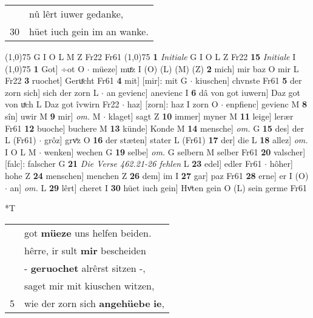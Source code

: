 \documentclass[8pt,a4paper,notitlepage]{article}
\begin{document}
\begin{table}[ht]
\begin{minipage}[t]{0.5\linewidth}
\begin{tabular}{rl}
 & nû lêrt iuwer gedanke,\\ 
30 & hüet iuch gein im an wanke.\\ 
\end{tabular}
\scriptsize
\line(1,0){75} \newline
G I O L M Z Fr22 Fr61 \newline
\line(1,0){75} \newline
\textbf{1} \textit{Initiale} G I O L Z Fr22  \textbf{15} \textit{Initiale} I  \newline
\line(1,0){75} \newline
\textbf{1} Got] ÷ot O  $\cdot$ müeze] muͤz I (O) (L) (M) (Z) \textbf{2} mich] mir baz O mir L Fr22 \textbf{3} ruochet] Geruͤcht Fr61 \textbf{4} mit] [mir]: mit G  $\cdot$ kiuschen] chvnste Fr61 \textbf{5} der zorn sich] sich der zorn L  $\cdot$ an gevienc] anevienc I \textbf{6} dâ von got iuwern] Daz got von uͯch L Daz got îvwirn Fr22  $\cdot$ haz] [zorn]: haz I zorn O  $\cdot$ enpfienc] gevienc M \textbf{8} sîn] uwir M \textbf{9} mir] \textit{om.} M  $\cdot$ klaget] sagt Z \textbf{10} immer] myner M \textbf{11} leige] lerær Fr61 \textbf{12} buoche] buchere M \textbf{13} künde] Konde M \textbf{14} mensche] \textit{om.} G \textbf{15} des] der L (Fr61)  $\cdot$ grôz] grvͦz O \textbf{16} der stæten] stater L (Fr61) \textbf{17} der] die L \textbf{18} allez] \textit{om.} I O L M  $\cdot$ wenken] wechen G \textbf{19} selbe] \textit{om.} G selbern M selber Fr61 \textbf{20} valscher] [falc]: falscher G \textbf{21} \textit{Die Verse 462.21-26 fehlen} L  \textbf{23} edel] edler Fr61  $\cdot$ hôher] hohe Z \textbf{24} menschen] menchen Z \textbf{26} dem] im I \textbf{27} gar] paz Fr61 \textbf{28} erne] er I (O)  $\cdot$ an] \textit{om.} L \textbf{29} lêrt] cheret I \textbf{30} hüet iuch gein] Hvͦten gein O (L) sein germe Fr61 \newline
\end{minipage}
\hspace{0.5cm}
\begin{minipage}[t]{0.5\linewidth}
\small
\begin{center}*T
\end{center}
\begin{tabular}{rl}
 & got \textbf{müeze} uns helfen beiden.\\ 
 & hêrre, ir sult \textbf{mir} bescheiden\\ 
 & - \textbf{geruochet} alrêrst sitzen -,\\ 
 & saget mir mit kiuschen witzen,\\ 
5 & wie der zorn sich \textbf{angehüebe} \textbf{ie},\\ 

\end{tabular}
\end{minipage}
\end{table}
\end{document}
